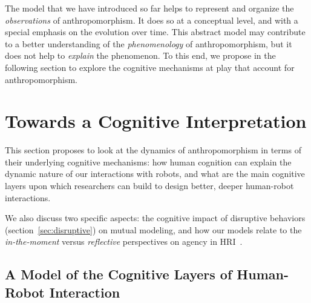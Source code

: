 \documentclass{frontiersSCNS} %
\begin{document}
The model that we have introduced so far helps to represent and organize the
\emph{observations} of anthropomorphism. It does so at a conceptual level, and
with a special emphasis on the evolution over time.  This abstract model may
contribute to a better understanding of the \emph{phenomenology} of
anthropomorphism, but it does not help to \emph{explain} the phenomenon. To this
end, we propose in the following section to explore the cognitive mechanisms at
play that account for anthropomorphism.

%
%
%
%
%
%

\section{Towards a Cognitive Interpretation}
\label{sec:cognition-neuroscience}

This section proposes to look at the dynamics of anthropomorphism in terms of
their underlying cognitive mechanisms: how human cognition can explain the
dynamic nature of our interactions with robots, and what are the main cognitive
layers upon which researchers can build to design better, deeper human-robot
interactions.

We also discuss two specific aspects: the cognitive impact of disruptive
behaviors (section~\ref{sec:disruptive}) on mutual modeling, and how our models
relate to the \emph{in-the-moment} versus \emph{reflective} perspectives on
agency in HRI~\citep{takayama_perspectives_2012}.


\subsection{A Model of the Cognitive Layers of Human-Robot Interaction}
\label{sec:cognitive-model}
\end{document}
